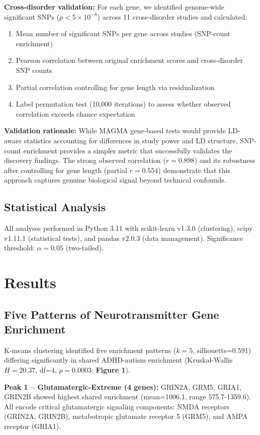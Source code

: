 \documentclass[12pt,letterpaper]{article}
\theoremstyle{definition}
\theoremstyle{remark}
\begin{document}
\textbf{Cross-disorder validation:} For each gene, we identified genome-wide significant SNPs ($p<5\times10^{-8}$) across 11 cross-disorder studies and calculated:
\begin{enumerate}
    \item Mean number of significant SNPs per gene across studies (SNP-count enrichment)
    \item Pearson correlation between original enrichment scores and cross-disorder SNP counts
    \item Partial correlation controlling for gene length via residualization
    \item Label permutation test (10,000 iterations) to assess whether observed correlation exceeds chance expectation
\end{enumerate}

\textbf{Validation rationale:} While MAGMA gene-based tests would provide LD-aware statistics accounting for differences in study power and LD structure, SNP-count enrichment provides a simpler metric that successfully validates the discovery findings. The strong observed correlation ($r=0.898$) and its robustness after controlling for gene length (partial $r=0.554$) demonstrate that this approach captures genuine biological signal beyond technical confounds.

\subsection{Statistical Analysis}

All analyses performed in Python 3.11 with scikit-learn v1.3.0 (clustering), scipy v1.11.1 (statistical tests), and pandas v2.0.3 (data management). Significance threshold: $\alpha=0.05$ (two-tailed).

\section{Results}

\subsection{Five Patterns of Neurotransmitter Gene Enrichment}

K-means clustering identified five enrichment patterns ($k=5$, silhouette=0.591) differing significantly in shared ADHD-autism enrichment (Kruskal-Wallis $H=20.37$, df=4, $p=0.0003$; \textbf{Figure 1}).

\textbf{Peak 1 -- Glutamatergic-Extreme (4 genes):} GRIN2A, GRM5, GRIA1, GRIN2B showed highest shared enrichment (mean=1006.1, range 575.7-1359.6). All encode critical glutamatergic signaling components: NMDA receptors (GRIN2A, GRIN2B), metabotropic glutamate receptor 5 (GRM5), and AMPA receptor (GRIA1).
\end{document}
